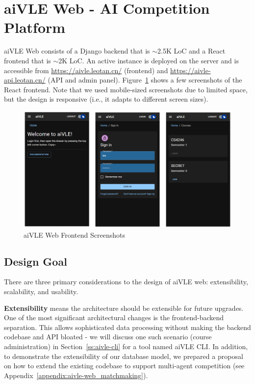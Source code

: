 \section{aiVLE Web - AI Competition Platform}
\label{ch:aivle-web}
aiVLE Web consists of a Django backend that is $\sim$2.5K LoC and a React frontend that is $\sim$2K LoC. An active instance is deployed on the server and is accessible from \href{https://aivle.leotan.cn/}{https://aivle.leotan.cn/} (frontend) and \href{https://aivle-api.leotan.cn/}{https://aivle-api.leotan.cn/} (API and admin panel). Figure~\ref{fig:aivle-web-frontend-screenshot} shows a few screenshots of the React frontend. Note that we used mobile-sized screenshots due to limited space, but the design is responsive (i.e., it adapts to different screen sizes).

\begin{figure}[H]
    \centering
    \includegraphics[width=\textwidth]{images/aivle-web-frontend-screenshot.png}
    \caption{aiVLE Web Frontend Screenshots}
    \label{fig:aivle-web-frontend-screenshot}
\end{figure}

\subsection{Design Goal}
There are three primary considerations to the design of aiVLE web: extensibility, scalability, and usability. 

\textbf{Extensibility} means the architecture should be extensible for future upgrades. One of the most significant architectural changes is the frontend-backend separation. This allows sophisticated data processing without making the backend codebase and API bloated - we will discuss one such scenario (course administration) in Section~\ref{ss:aivle-cli} for a tool named aiVLE CLI. In addition, to demonstrate the extensibility of our database model, we prepared a proposal on how to extend the existing codebase to support multi-agent competition (see Appendix~\ref{appendix:aivle-web_matchmaking}).

